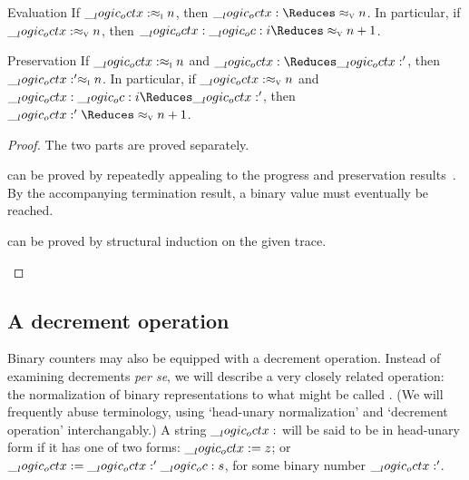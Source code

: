\begin{corollary}
  \leavevmode
  \begin{thinthmdescription}
  \item[Evaluation]
    If $\__logic_octx: \approx\sb{\text{\normalfont\scshape i}} n$, then $\octx \Reduces\aval{}{n}$.
    In particular, if $\__logic_octx: \approx\sb{\text{\normalfont\scshape v}} n$, then $\octx \oc i \Reduces\aval{}{n+1}$.
  \item[Preservation]
    If $\__logic_octx: \approx\sb{\text{\normalfont\scshape i}} n$ and $\octx \Reduces \octx'$, then $\__logic_octx:' \approx\sb{\text{\normalfont\scshape i}} n$.
    In particular, if $\__logic_octx: \approx\sb{\text{\normalfont\scshape v}} n$ and $\octx \oc i \Reduces \octx'$, then $\octx' \Reduces\aval{}{n+1}$.
  \end{thinthmdescription}
\end{corollary}
\begin{proof}
  The two parts are proved separately.
  \begin{description}[labelsep=0.35em]
  \item[Evaluation] can be proved by repeatedly appealing to the progress and preservation results~.
    By the accompanying termination result, a binary value must eventually be reached.
  \item[Preservation] can be proved by structural induction on the given trace.
  \qedhere
  \end{description}
\end{proof}


\subsection{A decrement operation}

Binary counters may also be equipped with a decrement operation.
Instead of examining decrements \emph{per se}, we will describe a very closely related operation: the normalization of binary representations to what might be called .
(We will frequently abuse terminology, using \enquote*{head-unary normalization} and \enquote*{decrement operation} interchangably.)
A string $\__logic_octx:$ will be said to be in head-unary form if it has one of two forms: $\__logic_octx: = z$; or $\__logic_octx: = \__logic_octx:' \__logic_oc: s$, for some binary number $\__logic_octx:'$.

